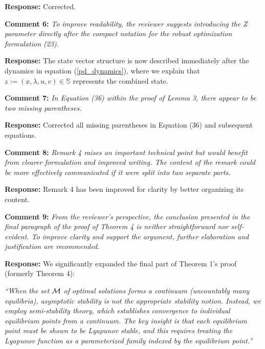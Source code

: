 \documentclass[journal,twoside,web]{ieeecolor}
\begin{document}
\noindent\textbf{Response:} Corrected.

\vspace{0.5em}
\noindent\textbf{Comment 6:} \textit{To improve readability, the reviewer suggests introducing the Z parameter directly after the compact notation for the robust optimization formulation (23).}

\noindent\textbf{Response:} The state vector structure is now described immediately after the dynamics in equation (\ref{pd_dynamics}), where we explain that $z:=(x,\lambda,u,v) \in \mathbb{S}$ represents the combined state.

\vspace{0.5em}
\noindent\textbf{Comment 7:} \textit{In Equation (36) within the proof of Lemma 3, there appear to be two missing parentheses.}

\noindent\textbf{Response:} Corrected all missing parentheses in Equation (36) and subsequent equations.

\vspace{0.5em}
\noindent\textbf{Comment 8:} \textit{Remark 4 raises an important technical point but would benefit from clearer formulation and improved writing. The content of the remark could be more effectively communicated if it were split into two separate parts.}

\noindent\textbf{Response:} Remark 4 has been improved for clarity by better organizing its content.

\vspace{0.5em}
\noindent\textbf{Comment 9:} \textit{From the reviewer's perspective, the conclusion presented in the final paragraph of the proof of Theorem 4 is neither straightforward nor self-evident. To improve clarity and support the argument, further elaboration and justification are recommended.}

\noindent\textbf{Response:} We significantly expanded the final part of Theorem 1's proof (formerly Theorem 4):

{\color{revisionblue}\textit{``When the set ${\cal M}$ of optimal solutions forms a continuum (uncountably many equilibria), asymptotic stability is not the appropriate stability notion. Instead, we employ semi-stability theory, which establishes convergence to individual equilibrium points from a continuum. The key insight is that each equilibrium point must be shown to be Lyapunov stable, and this requires treating the Lyapunov function as a parameterized family indexed by the equilibrium point.''}}
\end{document}
